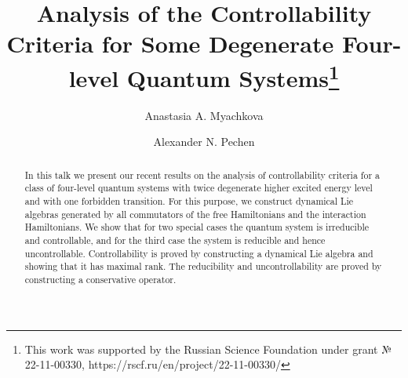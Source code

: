 \documentclass[12pt]{llncs}
\begin{document}
%
\fi

\title{Analysis of the Controllability Criteria for Some Degenerate Four-level Quantum Systems\thanks{This work was supported by the Russian Science Foundation under grant № 22-11-00330, https://rscf.ru/en/project/22-11-00330/}}
%
%
\author{Anastasia A. Myachkova\and
Alexander N. Pechen}
%
%
%

\maketitle 

\begin{abstract}
In this talk we present our recent results on the analysis of controllability criteria for a class of four-level quantum systems with twice degenerate higher excited energy level and with one forbidden transition. For this purpose, we construct dynamical Lie algebras generated by all commutators of the free Hamiltonians and the interaction Hamiltonians. We show that for two special cases the quantum system is irreducible and controllable, and for the third case the system is reducible and hence uncontrollable. Controllability is proved by constructing a dynamical Lie algebra and showing that it has maximal rank. The reducibility and uncontrollability are proved by constructing a conservative operator. 
\end{abstract}
\end{document}
